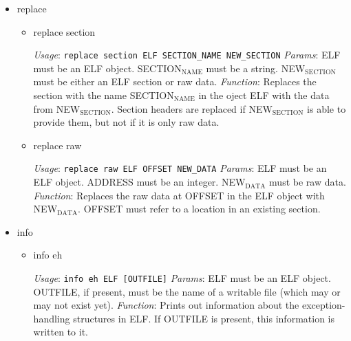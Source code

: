 \documentclass[11pt]{article}
\begin{document}
\begin{itemize}
\item replace\\
\label{sec-2.1.2.4}

\begin{itemize}

\item replace section\\
\label{sec-2.1.2.4.1}

      \emph{Usage}: \texttt{replace section ELF SECTION\_NAME NEW\_SECTION}
      \emph{Params}: ELF must be an ELF object. SECTION$_{\mathrm{NAME}}$ must be a
                string. NEW$_{\mathrm{SECTION}}$ must be either an ELF section or raw data.
      \emph{Function}: Replaces the section with the name SECTION$_{\mathrm{NAME}}$ in
                  the oject ELF with the data from
                  NEW$_{\mathrm{SECTION}}$. Section headers are replaced if NEW$_{\mathrm{SECTION}}$ is
                  able to provide them, but not if it is only raw data.
                   

\item replace raw\\
\label{sec-2.1.2.4.2}

      \emph{Usage}: \texttt{replace raw ELF OFFSET NEW\_DATA}
      \emph{Params}: ELF must be an ELF object. ADDRESS must be an
                integer. NEW$_{\mathrm{DATA}}$ must be raw data.
      \emph{Function}: Replaces the raw data at OFFSET in the ELF object
                  with NEW$_{\mathrm{DATA}}$. OFFSET must refer to a location in an
                  existing section.
\end{itemize} %

\item info\\
\label{sec-2.1.2.5}

\begin{itemize}

\item info eh\\
\label{sec-2.1.2.5.1}

      \emph{Usage}: \texttt{info eh ELF [OUTFILE]}
      \emph{Params}: ELF must be an ELF object. OUTFILE, if present, must
                be the name of a writable file (which may or may not
                exist yet). 
      \emph{Function}: Prints out information about the exception-handling
                  structures in ELF. If OUTFILE is present, this
                  information is written to it.
\end{itemize} %


\end{itemize}
\end{document}
